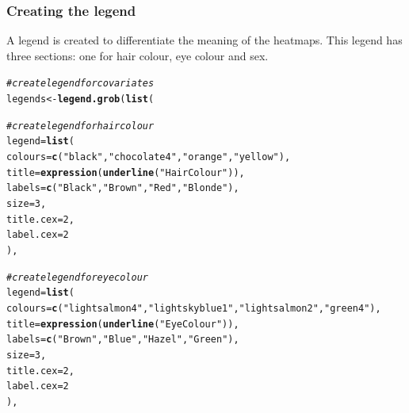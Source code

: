 \documentclass[letterpaper]{article}\usepackage[]{graphicx}\usepackage[]{color}
\makeatletter
\newcommand{\hlnum}[1]{\textcolor[rgb]{0.686,0.059,0.569}{#1}}%
\newcommand{\hlstr}[1]{\textcolor[rgb]{0.192,0.494,0.8}{#1}}%
\newcommand{\hlcom}[1]{\textcolor[rgb]{0.678,0.584,0.686}{\textit{#1}}}%
\newcommand{\hlstd}[1]{\textcolor[rgb]{0.345,0.345,0.345}{#1}}%
\newcommand{\hlkwb}[1]{\textcolor[rgb]{0.69,0.353,0.396}{#1}}%
\newcommand{\hlkwc}[1]{\textcolor[rgb]{0.333,0.667,0.333}{#1}}%
\newcommand{\hlkwd}[1]{\textcolor[rgb]{0.737,0.353,0.396}{\textbf{#1}}}%
\newenvironment{kframe}{%
 \def\at@end@of@kframe{}%
 \ifinner\ifhmode%
  \def\at@end@of@kframe{\end{minipage}}%
  \begin{minipage}{\columnwidth}%
 \fi\fi%
 \def\FrameCommand##1{\hskip\@totalleftmargin \hskip-\fboxsep
 \colorbox{shadecolor}{##1}\hskip-\fboxsep
     \hskip-\linewidth \hskip-\@totalleftmargin \hskip\columnwidth}%
 \MakeFramed {\advance\hsize-\width
   \@totalleftmargin\z@ \linewidth\hsize
   \@setminipage}}%
 {\par\unskip\endMakeFramed%
 \at@end@of@kframe}
\newenvironment{knitrout}{}{} %
\makeatother
\begin{document}
\subsubsection {Creating the legend}
A legend is created to differentiate the meaning of the heatmaps. This legend has three sections: one for hair colour, eye colour and sex.

\begin{knitrout}
\color{fgcolor}\begin{kframe}
\begin{alltt}
\hlcom{# create legend for covariates}
\hlstd{legends} \hlkwb{<-} \hlkwd{legend.grob}\hlstd{(} \hlkwd{list}\hlstd{(}

       \hlcom{# create legend for hair colour}
       \hlkwc{legend} \hlstd{=} \hlkwd{list}\hlstd{(}
               \hlkwc{colours} \hlstd{=} \hlkwd{c}\hlstd{(}\hlstr{"black"}\hlstd{,} \hlstr{"chocolate4"}\hlstd{,} \hlstr{"orange"}\hlstd{,} \hlstr{"yellow"}\hlstd{),}
               \hlkwc{title} \hlstd{=} \hlkwd{expression}\hlstd{(}\hlkwd{underline}\hlstd{(}\hlstr{"Hair Colour"}\hlstd{)),}
               \hlkwc{labels} \hlstd{=} \hlkwd{c}\hlstd{(}\hlstr{"Black"}\hlstd{,} \hlstr{"Brown"}\hlstd{,} \hlstr{"Red"}\hlstd{,} \hlstr{"Blonde"}\hlstd{),}
               \hlkwc{size} \hlstd{=} \hlnum{3}\hlstd{,}
               \hlkwc{title.cex} \hlstd{=} \hlnum{2}\hlstd{,}
               \hlkwc{label.cex} \hlstd{=} \hlnum{2}
               \hlstd{),}

       \hlcom{# create legend for eye colour}
       \hlkwc{legend} \hlstd{=} \hlkwd{list}\hlstd{(}
               \hlkwc{colours} \hlstd{=} \hlkwd{c}\hlstd{(}\hlstr{"lightsalmon4"}\hlstd{,} \hlstr{"lightskyblue1"}\hlstd{,} \hlstr{"lightsalmon2"}\hlstd{,} \hlstr{"green4"}\hlstd{),}
               \hlkwc{title} \hlstd{=} \hlkwd{expression}\hlstd{(}\hlkwd{underline}\hlstd{(}\hlstr{"Eye Colour"}\hlstd{)),}
               \hlkwc{labels} \hlstd{=} \hlkwd{c}\hlstd{(}\hlstr{"Brown"}\hlstd{,} \hlstr{"Blue"}\hlstd{,} \hlstr{"Hazel"}\hlstd{,} \hlstr{"Green"}\hlstd{),}
               \hlkwc{size} \hlstd{=} \hlnum{3}\hlstd{,}
               \hlkwc{title.cex} \hlstd{=} \hlnum{2}\hlstd{,}
               \hlkwc{label.cex} \hlstd{=} \hlnum{2}
               \hlstd{),}


\end{alltt}
\end{kframe}
\end{knitrout}
\end{document}
